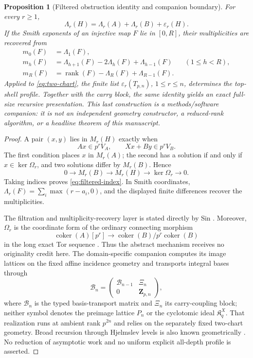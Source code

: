 \documentclass[12pt,a4paper]{article}
\newtheorem{proposition}[theorem]{Proposition}
\theoremstyle{definition}
\newcommand{\coker}{\operatorname{coker}}
\newcommand{\rank}{\operatorname{rank}}
\newcommand{\eps}{\varepsilon}
\begin{document}
\begin{proposition}[Filtered obstruction identity and companion boundary]
\label{prop:filtered-obstruction}
For every $r\geq1$,
\begin{equation}\label{eq:filtered-index}
 \Lambda_r(H)=\Lambda_r(A)+\Lambda_r(B)+\eps_r(H).
\end{equation}
If the Smith exponents of an injective map $F$ lie in $[0,R]$, their
multiplicities are recovered from
\begin{align*}
 m_0(F)&=\Lambda_1(F),\\
 m_h(F)&=\Lambda_{h+1}(F)-2\Lambda_h(F)+\Lambda_{h-1}(F)
       &&(1\leq h<R),\\
 m_R(F)&=\rank(F)-\Lambda_R(F)+\Lambda_{R-1}(F).
\end{align*}
Applied to \eqref{eq:two-chart}, the finite list
$\eps_r(T_{p,n})$, $1\leq r\leq n$, determines the top-shell profile.
Together with the carry block, the same identity yields an exact full-size
recursive presentation.  This last construction is a methods/software
companion: it is not an independent geometry constructor, a reduced-rank
algorithm, or a headline theorem of this manuscript.
\end{proposition}

\begin{proof}
A pair $(x,y)$ lies in $M_r(H)$ exactly when
\[
 Ax\in p^rV_A,\qquad Xx+By\in p^rV_B.
\]
The first condition places $x$ in $M_r(A)$; the second has a solution if and
only if $x\in\ker\Omega_r$, and two solutions differ by $M_r(B)$.  Hence
\[
 0\longrightarrow M_r(B)\longrightarrow M_r(H)
 \longrightarrow\ker\Omega_r\longrightarrow0.
\]
Taking indices proves \eqref{eq:filtered-index}.  In Smith coordinates,
$\Lambda_r(F)=\sum_i\max(r-a_i,0)$, and the displayed finite differences
recover the multiplicities.

The filtration and multiplicity-recovery layer is stated directly by Sin
\cite[Section~2.1, equations~(4)--(8)]{SIN14}.  Moreover, $\Omega_r$ is the
coordinate form of the ordinary connecting morphism
\[
 \coker(A)[p^r]\longrightarrow\coker(B)/p^r\coker(B)
\]
in the long exact Tor sequence \cite[Lemma~10.75.2]{STK-TOR}.  Thus the
abstract mechanism receives no originality credit here.  The domain-specific
companion computes its image lattices on the fixed affine incidence geometry and transports
integral bases through
\[
 \mathcal B_n=
 \begin{pmatrix}\mathcal B_{n-1}&\Xi_n\\0&\mathbf Z_{p,n}\end{pmatrix},
\]
where $\mathcal B_n$ is the typed basis-transport matrix and $\Xi_n$ its
carry-coupling block; neither symbol denotes the preimage lattice $P_n$ or
the cyclotomic ideal $\mathfrak K_q^X$.
That realization runs at ambient rank $p^{2n}$ and relies on the separately
fixed two-chart geometry.  Broad recursion through Hjelmslev levels is also
known geometrically \mbox{\cite{HVM89,KOH09}}.  No reduction of asymptotic work and
no uniform explicit all-depth profile is asserted.
\end{proof}
\end{document}
